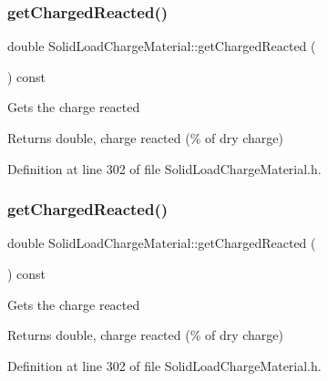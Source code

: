\subsubsection{\texorpdfstring{get\+Charged\+Reacted()}{getChargedReacted()}\hspace{0.1cm}{\footnotesize\ttfamily [2/3]}}
{\footnotesize\ttfamily double Solid\+Load\+Charge\+Material\+::get\+Charged\+Reacted (\begin{DoxyParamCaption}{ }\end{DoxyParamCaption}) const\hspace{0.3cm}{\ttfamily [inline]}}

Gets the charge reacted \begin{DoxyReturn}{Returns}
double, charge reacted (\% of dry charge) 
\end{DoxyReturn}


Definition at line 302 of file Solid\+Load\+Charge\+Material.\+h.

\mbox{\label{class_solid_load_charge_material_a7c7f05b6ee14eb5f07e5c48c30e9c7a1}} 
\subsubsection{\texorpdfstring{get\+Charged\+Reacted()}{getChargedReacted()}\hspace{0.1cm}{\footnotesize\ttfamily [3/3]}}
{\footnotesize\ttfamily double Solid\+Load\+Charge\+Material\+::get\+Charged\+Reacted (\begin{DoxyParamCaption}{ }\end{DoxyParamCaption}) const\hspace{0.3cm}{\ttfamily [inline]}}

Gets the charge reacted \begin{DoxyReturn}{Returns}
double, charge reacted (\% of dry charge) 
\end{DoxyReturn}


Definition at line 302 of file Solid\+Load\+Charge\+Material.\+h.

\mbox{\label{class_solid_load_charge_material_af6f018c5d67e94d86f2f57fecaa32b5c}} 
